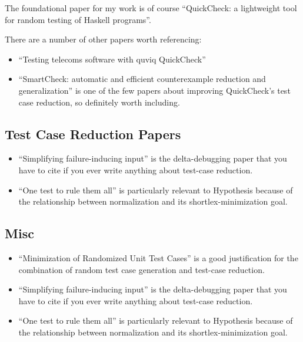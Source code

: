 The foundational paper for my work is of course ``QuickCheck: a lightweight tool for random testing of Haskell programs''\cite{DBLP:conf/icfp/ClaessenH00}.

There are a number of other papers worth referencing:

\begin{itemize}
\item ``Testing telecoms software with quviq QuickCheck''\cite{DBLP:conf/erlang/ArtsHJW06}
\item ``SmartCheck: automatic and efficient counterexample reduction and generalization''\cite{DBLP:conf/haskell/Pike14} is one of the few papers about improving QuickCheck's test case reduction,
so definitely worth including.
\end{itemize}

\subsection{Test Case Reduction Papers}

\begin{itemize}
\item ``Simplifying failure-inducing input''\cite{DBLP:conf/issta/HildebrandtZ00} is the delta-debugging paper that you have to cite if you ever write anything about test-case reduction.
\item ``One test to rule them all''\cite{DBLP:conf/issta/GroceHK17} is particularly relevant to Hypothesis because of the relationship between normalization and its shortlex-minimization goal.
\end{itemize}

\subsection{Misc}

\begin{itemize}
\item ``Minimization of Randomized Unit Test Cases''\cite{DBLP:conf/issre/LeiA05} is a good justification for the combination of random test case generation and test-case reduction.
\end{itemize}

\begin{itemize}
\item ``Simplifying failure-inducing input''\cite{DBLP:conf/issta/HildebrandtZ00} is the delta-debugging paper that you have to cite if you ever write anything about test-case reduction.
\item ``One test to rule them all''\cite{DBLP:conf/issta/GroceHK17} is particularly relevant to Hypothesis because of the relationship between normalization and its shortlex-minimization goal.
\end{itemize}

